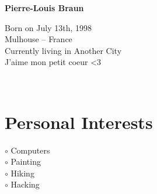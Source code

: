 \documentclass[a4paper,10pt]{article}
\begin{document}
\thispagestyle{empty}

\begin{adjustbox}{valign=t}
\begin{minipage}{0.3\textwidth} %
\begin{center}

\MySkip 	%

\raggedright
{\LARGE \bfseries Pierre-Louis Braun}

\MySkip 	%

Born on July 13th, 1998\\
Mulhouse -- France\\
Currently living in Another City\\
J'aime mon petit coeur <3\\

\MySkip 	%

\textcolor{ColorTwo}{\faEnvelopeO}
 \\

\textcolor{ColorTwo}{\faChain}
\end{center}

\vfill

\section*{Personal Interests}
\raggedright
\begin{spacing}{1.0}
\textcolor{ColorOne}{$\circ$} Computers\\
\textcolor{ColorOne}{$\circ$} Painting\\
\textcolor{ColorOne}{$\circ$} Hiking\\
\textcolor{ColorOne}{$\circ$} Hacking\\
\end{spacing}


\end{minipage}
\end{adjustbox}
\end{document}
